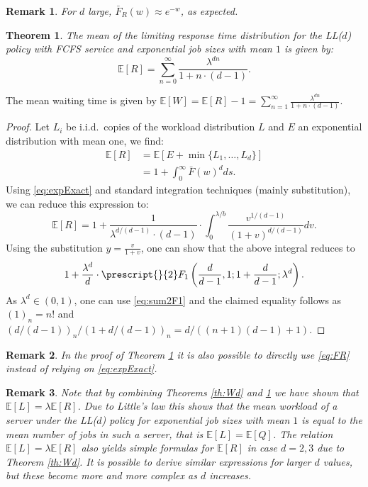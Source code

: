\documentclass[12pt]{report}
\newcommand{\E}{\mathbb{E}}
\newtheorem{theorem}{Theorem}
\newtheorem{remark}{Remark}
\begin{document}
\begin{remark}
For $d$ large, $\bar F_R(w) \approx e^{-w}$, as expected. 
\end{remark}

\begin{theorem}\label{eig:T_d}
The mean of the limiting response time distribution for the LL($d$) policy with FCFS service
and exponential job sizes with mean $1$ is given by:
\begin{equation}\label{eq:T_kclosed}
\E[R]
=
\sum_{n=0}^{\infty} \frac{\lambda^{dn}}{1 + n \cdot (d-1)}.
\end{equation}
\end{theorem}
The mean waiting time is given by $\E[W] = \E[R] - 1 = \sum_{n=1}^{\infty} \frac{\lambda^{dn}}{1 + n \cdot (d-1)}$.
\begin{proof}
Let $L_i$ be i.i.d.~copies of the workload distribution $L$ and $E$ an exponential distribution with mean one, we find:
\begin{align*}
\E[R] &= \E[E + \min\{L_1,\dots,L_d\}]\\
&=1 + \int_0^\infty \bar{F}(w)^dds.
\end{align*}
Using \eqref{eq:expExact} and standard integration techniques (mainly substitution), we can reduce this expression to:
$$
\E[R] = 1 + \frac{1}{\lambda^{d/(d-1)} \cdot (d-1)} \cdot \int_0^{\lambda / b} \frac{v^{1/(d-1)}}{(1+v)^{d/(d-1)}} dv.
$$
Using the substitution $y = \frac{v}{1 + v}$, one can show that the above integral reduces to
$$
1 + \frac{\lambda^d}{d} \cdot \prescript{}{2}F_1 \left( \frac{d}{d-1},1;1+\frac{d}{d-1};\lambda^d\right).
$$
As $\lambda^d \in (0,1)$, one can use \eqref{eq:sum2F1} and the claimed equality follows as $(1)_n=n!$ and $(d/(d-1))_n/(1+d/(d-1))_n = d/((n+1)(d-1)+1)$. 
\end{proof}

\begin{remark}
In the proof of Theorem \ref{eig:T_d} it is also possible to directly use \eqref{eq:FR} instead of relying on \eqref{eq:expExact}.
\end{remark}

\begin{remark}
Note that by combining Theorems \ref{th:Wd} and \ref{eig:T_d} we have shown that $\E[L] = \lambda \E[R]$. Due to Little's law this shows that the mean workload of a server under the LL($d$) policy for exponential job sizes with mean $1$ is equal to the mean number
of jobs in such a server, that is $\E[L]=\E[Q]$. 
The relation $\E[L] = \lambda \E[R]$ also yields simple formulas for 
$\E[R]$ in case $d=2,3$ due to Theorem \ref{th:Wd}. It is possible to derive similar expressions for larger $d$ values, but these become more and more complex as $d$ increases. 
\end{remark}
\end{document}
